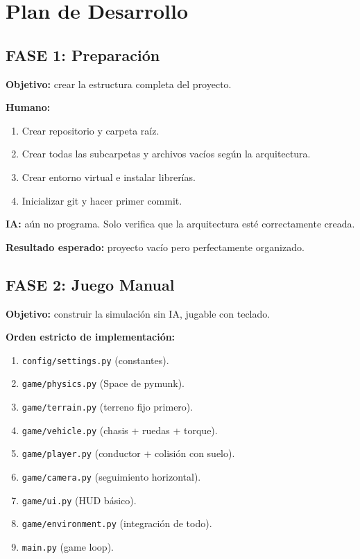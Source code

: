 \documentclass[11pt,a4paper]{article}
\begin{document}
\section{Plan de Desarrollo}

\subsection{FASE 1: Preparación}

\textbf{Objetivo:} crear la estructura completa del proyecto.

\textbf{Humano:}
\begin{enumerate}
    \item Crear repositorio y carpeta raíz.
    \item Crear todas las subcarpetas y archivos vacíos según la arquitectura.
    \item Crear entorno virtual e instalar librerías.
    \item Inicializar git y hacer primer commit.
\end{enumerate}

\textbf{IA:} aún no programa. Solo verifica que la arquitectura esté correctamente creada.

\textbf{Resultado esperado:} proyecto vacío pero perfectamente organizado.

\subsection{FASE 2: Juego Manual}

\textbf{Objetivo:} construir la simulación sin IA, jugable con teclado.

\textbf{Orden estricto de implementación:}
\begin{enumerate}
    \item \texttt{config/settings.py} (constantes).
    \item \texttt{game/physics.py} (Space de pymunk).
    \item \texttt{game/terrain.py} (terreno fijo primero).
    \item \texttt{game/vehicle.py} (chasis + ruedas + torque).
    \item \texttt{game/player.py} (conductor + colisión con suelo).
    \item \texttt{game/camera.py} (seguimiento horizontal).
    \item \texttt{game/ui.py} (HUD básico).
    \item \texttt{game/environment.py} (integración de todo).
    \item \texttt{main.py} (game loop).
\end{enumerate}
\end{document}
